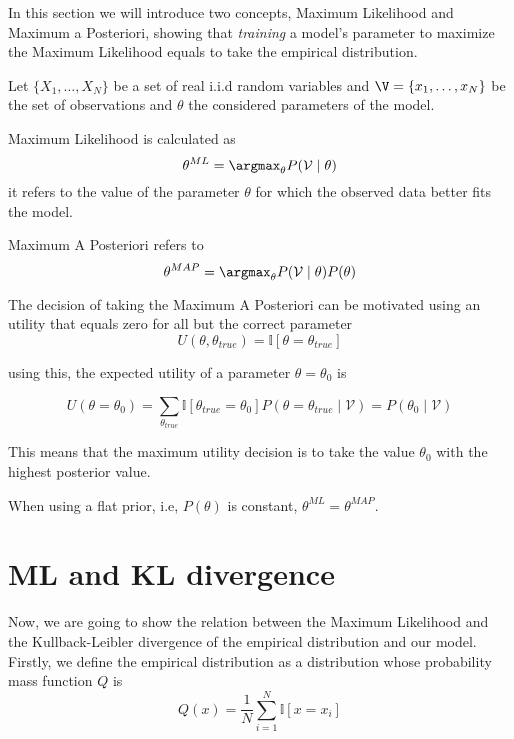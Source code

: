 
In this section we will introduce two concepts, Maximum Likelihood and Maximum a
Posteriori, showing that \emph{training} a model's parameter to maximize the
Maximum Likelihood equals to take the empirical distribution.

Let \(\{X_{1},\dots, X_{N}\}\) be a set of real i.i.d random variables and \(\V = \{x_{1}, \dots, x_{N}\}\) be the set of observations and \(\theta\) the considered parameters of the model.

\begin{definition}
  Maximum Likelihood is calculated as
  \[
    \theta^{ML} = \argmax_\theta P(\mathcal{V} \mid \theta)
  \]
   it refers to the value of the parameter
\(\theta\) for which the observed data better fits the model.
\end{definition}

\begin{definition}
  Maximum A Posteriori refers to
  \[
    \theta^{MAP} = \argmax_\theta P(\mathcal{V} \mid \theta)P(\theta)
  \]
\end{definition}

The decision of taking the Maximum A Posteriori can be motivated using an
utility that equals zero for all but the correct parameter
\[
  U(\theta, \theta_{true}) = \mathbb{I}[\theta = \theta_{true}]
\]

using this, the expected utility of a parameter \(\theta = \theta_0\) is

\[
  U(\theta = \theta_0) = \sum_{\theta_{true}}\mathbb{I}[\theta_{true} = \theta_0]P(\theta = \theta_{true}  \mid  \mathcal{V}) = P(\theta_0  \mid  \mathcal{V})
\]

This means that the maximum utility decision is to take the value \(\theta_0\)
with the highest posterior value.

\begin{remark}
  When using a flat prior, i.e, \(P(\theta)\) is constant, \(\theta^{ML}= \theta ^{MAP}\).
\end{remark}

\section{ML and KL divergence}

Now, we are going to show the relation between the Maximum Likelihood and the
Kullback-Leibler divergence of the empirical distribution and our model.
Firstly, we define the empirical distribution as a distribution whose probability mass function
\(Q\) is
\[
  Q(x) = \frac{1}{N}\sum_{i = 1}^N \mathbb{I}[x = x_i]
\]

